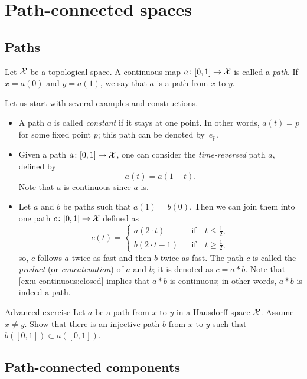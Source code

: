 \chapter{Path-connected spaces}\label{chap:path-connected}

\section{Paths}\label{sec:Operations on paths}

Let $\mathcal{X}$ be a topological space.
A continuous map $a\colon[0,1]\to \mathcal{X}$ is called a \emph{path}.
If $x=a(0)$ and $y=a(1)$, we say that $a$ is a path from $x$ to $y$.

Let us start with several examples and constructions.
\begin{itemize}
\item A path $a$ is called \emph{constant} if it stays at one point.
In other words, $a(t)=p$ for some fixed point $p$; this path can be denoted by~$e_p$.

\item Given a path $a\colon[0,1]\to \mathcal{X}$, one can consider the \emph{time-reversed} path $\bar a$, defined by
\[\bar a(t)=a(1-t).\]
Note that $\bar a$ is continuous since $a$ is.

\item Let $a$ and $b$ be paths such that $a(1)=b(0)$.
Then we can join them into one path $c\colon[0,1]\to \mathcal{X}$ defined as
\[c(t)=
\left\{
\begin{aligned}
a(2\cdot t)&&\text{if}&\ t\le \tfrac12,
\\
b(2\cdot t-1)&&\text{if}&\ t\ge \tfrac12;
\end{aligned}
\right.
\]
so, $c$ follows $a$ twice as fast and then $b$ twice as fast.
The path $c$ is called the \emph{product} (or \emph{concatenation}) of $a$ and $b$; it is denoted as $c=a * b$.
Note that \ref{ex:u-continuous:closed} implies that $a*b$ is continuous;
in other words, $a*b$ is indeed a path.
\end{itemize}

\begin{thm}{Advanced exercise}\label{ex:simple-path}
Let $a$ be a path from $x$ to $y$ in a Hausdorff space $\mathcal{X}$.
Assume $x\ne y$.
Show that there is an injective path $b$ from $x$ to $y$ such that $b([0,1])\subset a([0,1])$.
\end{thm}

\section{Path-connected components}\label{sec:Path-connected components}

